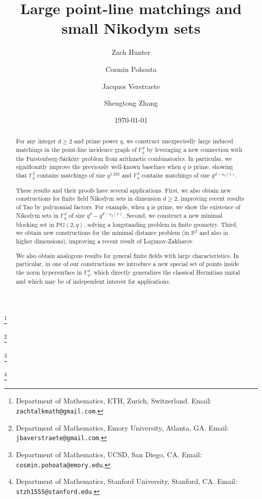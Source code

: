 \documentclass[12pt,reqno]{amsart}
\theoremstyle{plain}
\theoremstyle{definition}
\newcommand{\F}{\mathbb{F}}
\newcommand{\1}{\mathbf{1}}
\begin{document}
\title{Large point-line matchings and small Nikodym sets}

\author{Zach Hunter}
\thanks{Department of Mathematics, ETH, Zurich, Switzerland. Email: {\tt zachtalkmath@gmail.com}.}

\author{Cosmin Pohoata}
\thanks{Department of Mathematics, Emory University, Atlanta, GA. Email: {\tt jbaverstraete@gmail.com}.}

\author{Jacques Verstraete}
\thanks{Department of Mathematics, UCSD, San Diego, CA. Email: {\tt cosmin.pohoata@emory.edu}.}
\email{}

\author{Shengtong Zhang}
\thanks{Department of Mathematics, Stanford University, Stanford, CA. Email: {\tt stzh1555@stanford.edu}.}

\date{\today}

\begin{abstract}
\vspace{+15mm}
For any integer $d \geq 2$ and prime power $q$, we construct unexpectedly large induced matchings in the point-line incidence graph of $\mathbb{F}_{q}^{d}$ by leveraging a new connection with the Furstenberg-S\'ark\"ozy problem from arithmetic combinatorics. In particular, we significantly improve the previously well-known baselines when $q$ is prime, showing that $\mathbb{F}_{q}^{2}$ contains matchings of size $q^{1.233}$ and $\mathbb{F}_{q}^{d}$ contains matchings of size $q^{d-o_{d}(1)}$. 

These results and their proofs have several applications. First, we also obtain new constructions for finite field Nikodym sets in dimension $d \geq 2$, improving recent results of Tao by polynomial factors. For example, when $q$ is prime, we show the existence of Nikodym sets in $\F_q^d$ of size $q^d - q^{d - o_d(1)}$. Second, we construct a new minimal blocking set in $\mathrm{PG}(2,q)$, solving a longstanding problem in finite geometry. Third, we obtain new constructions for the minimal distance problem (in $\mathbb{R}^{2}$ and also in higher dimensions), improving a recent result of Logunov-Zakharov.

We also obtain analogous results for general finite fields with large characteristics. In particular, in one of our constructions we introduce a new special set of points inside the norm hypersurface in $\mathbb{F}_{q}^{d}$, which directly generalizes the classical Hermitian unital and which may be of independent interest for applications. 
\end{abstract}
\end{document}
